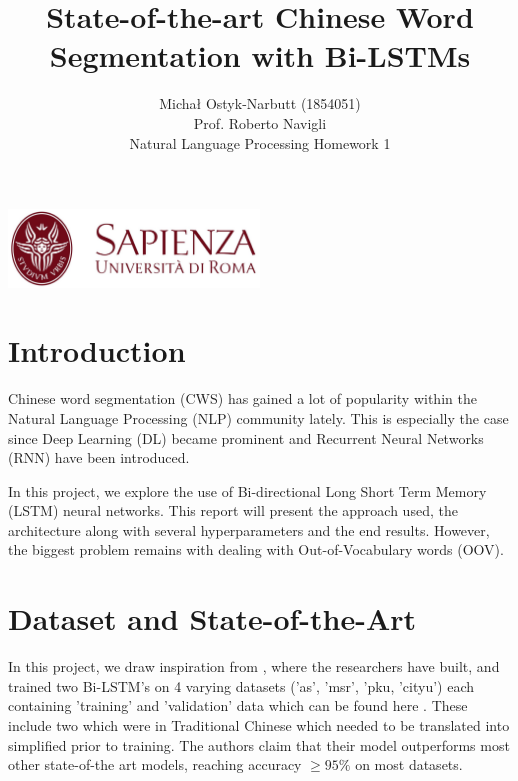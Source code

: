 \documentclass[12pt,a4paper]{article}
\begin{document}
\title{State-of-the-art Chinese Word Segmentation with Bi-LSTMs}
\author{Michał Ostyk-Narbutt (1854051)\\Prof. Roberto Navigli \\ Natural Language Processing Homework 1}

\maketitle


\begin{center}
\includegraphics[width=0.5\textwidth]{img/sapienza_logo.jpg}
\end{center}
\maketitle
\section{Introduction}
Chinese word segmentation (CWS) has gained a lot of popularity within the Natural Language Processing (NLP) community lately. This is especially the case since Deep Learning (DL) became prominent and Recurrent Neural Networks  (RNN) have been introduced.

In this project, we explore the use of Bi-directional Long Short Term Memory (LSTM) neural networks. This report will present the approach used, the architecture along with several hyperparameters and the end results. However, the biggest problem remains with dealing with Out-of-Vocabulary words (OOV).

\section{Dataset and State-of-the-Art}
In this project, we draw inspiration from \cite{paper}, where the researchers have built, and trained two Bi-LSTM's on 4 varying datasets ('as', 'msr', 'pku, 'cityu') each containing 'training' and 'validation' data which can be found here \cite{data}. These include two which were in Traditional Chinese which needed to be translated into simplified prior to training. The authors claim that their model outperforms most other state-of-the art models, reaching accuracy $\geq 95 \%$ on most datasets. 
\end{document}
